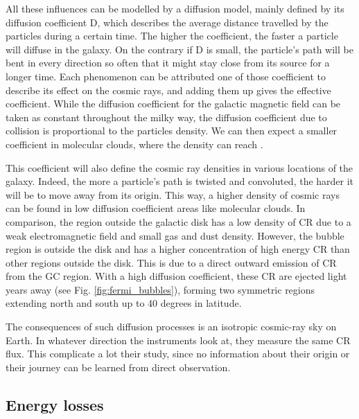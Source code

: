 All these influences can be modelled by a diffusion model, mainly defined by its diffusion coefficient D, which describes the average distance travelled by the particles during a certain time. The higher the coefficient, the faster a particle will diffuse in the galaxy. On the contrary if D is small, the particle's path will be bent in every direction so often that it might stay close from its source for a longer time. Each phenomenon can be attributed one of those coefficient to describe its effect on the cosmic rays, and adding them up gives the effective coefficient. 
While the diffusion coefficient for the galactic magnetic field can be taken as constant throughout the milky way, the diffusion coefficient due to collision is proportional to the particles density. We can then expect a smaller coefficient in molecular clouds, where the density can reach .

This coefficient will also define the cosmic ray densities in various locations of the galaxy. Indeed, the more a particle's path is twisted and convoluted, the harder it will be to move away from its origin. This way, a higher density of cosmic rays can be found in low diffusion coefficient areas like molecular clouds. In comparison, the region outside the galactic disk has a low density of CR due to a weak electromagnetic field and small gas and dust density. 
However, the bubble region is outside the disk and has a higher concentration of high energy CR than other regions outside the disk. This is due to a direct outward emission of CR from the GC region. With a high diffusion coefficient, these CR are ejected light years away (see Fig. \ref{fig:fermi_bubbles}), forming two symmetric regions extending north and south up to 40 degrees in latitude.

The consequences of such diffusion processes is an isotropic cosmic-ray sky on Earth. In whatever direction the instruments look at, they measure the same CR flux. This complicate a lot their study, since no information about their origin or their journey can be learned from direct observation. 

\subsection{Energy losses}

